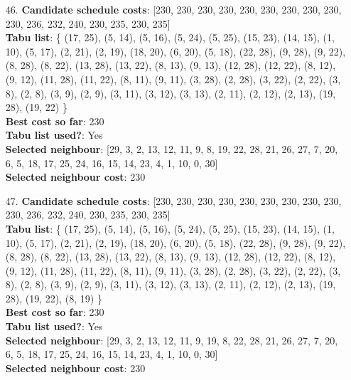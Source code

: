 \documentclass[fleqn]{article}
\begin{document}
\begin{itemize}
    \item[46.] \textbf{Candidate schedule costs}: [230, 230, 230, 230, 230, 230, 230, 230, 230, 230, 236, 232, 240, 230, 235, 230, 235] \\
    \textbf{Tabu list}: \{ (17, 25), (5, 14), (5, 16), (5, 24), (5, 25), (15, 23), (14, 15), (1, 10), (5, 17), (2, 21), (2, 19), (18, 20), (6, 20), (5, 18), (22, 28), (9, 28), (9, 22), (8, 28), (8, 22), (13, 28), (13, 22), (8, 13), (9, 13), (12, 28), (12, 22), (8, 12), (9, 12), (11, 28), (11, 22), (8, 11), (9, 11), (3, 28), (2, 28), (3, 22), (2, 22), (3, 8), (2, 8), (3, 9), (2, 9), (3, 11), (3, 12), (3, 13), (2, 11), (2, 12), (2, 13), (19, 28), (19, 22) \} \\
    \textbf{Best cost so far}: 230 \\
    \textbf{Tabu list used?}: Yes \\
    \textbf{Selected neighbour}: [29, 3, 2, 13, 12, 11, 9, 8, 19, 22, 28, 21, 26, 27, 7, 20, 6, 5, 18, 17, 25, 24, 16, 15, 14, 23, 4, 1, 10, 0, 30] \\
    \textbf{Selected neighbour cost}: 230
      

    \item[47.] \textbf{Candidate schedule costs}: [230, 230, 230, 230, 230, 230, 230, 230, 230, 230, 236, 232, 240, 230, 235, 230, 235] \\
    \textbf{Tabu list}: \{ (17, 25), (5, 14), (5, 16), (5, 24), (5, 25), (15, 23), (14, 15), (1, 10), (5, 17), (2, 21), (2, 19), (18, 20), (6, 20), (5, 18), (22, 28), (9, 28), (9, 22), (8, 28), (8, 22), (13, 28), (13, 22), (8, 13), (9, 13), (12, 28), (12, 22), (8, 12), (9, 12), (11, 28), (11, 22), (8, 11), (9, 11), (3, 28), (2, 28), (3, 22), (2, 22), (3, 8), (2, 8), (3, 9), (2, 9), (3, 11), (3, 12), (3, 13), (2, 11), (2, 12), (2, 13), (19, 28), (19, 22), (8, 19) \} \\
    \textbf{Best cost so far}: 230 \\
    \textbf{Tabu list used?}: Yes \\
    \textbf{Selected neighbour}: [29, 3, 2, 13, 12, 11, 9, 19, 8, 22, 28, 21, 26, 27, 7, 20, 6, 5, 18, 17, 25, 24, 16, 15, 14, 23, 4, 1, 10, 0, 30] \\
    \textbf{Selected neighbour cost}: 230
      


\end{itemize}
\end{document}
